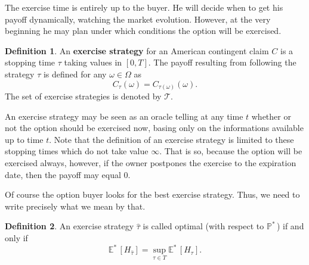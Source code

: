 \documentclass[a4paper,12pt, oneside]{book}
\theoremstyle{definition}
\newtheorem{mydef}{Definition}[chapter]
\theoremstyle{remark}
\def\Em{{\mathbb{E}^*}\,}
\def\Pm{{\mathbb{P}}^*\,}
\begin{document}
The exercise time is entirely up to the buyer. He will decide when to get his payoff dynamically, watching the market evolution. However, at the very beginning he may plan under which conditions the option will be exercised.
\begin{mydef}
 An \textbf{exercise strategy} for an American contingent claim $C$ is a stopping time $\tau$ taking values in $[0,T]$. The payoff resulting from following the strategy $\tau$ is defined for any $\omega \in \Omega$ as
 \[ C_{\tau}(\omega) = C_{\tau(\omega)}(\omega).\]
 The set of exercise strategies is denoted by $\mathcal{T}$. 
\end{mydef}
An exercise strategy may be seen as an oracle telling at any time $t$ whether or not the option should be exercised now, basing only on the informations available up to time $t$. Note that the definition of an exercise strategy is limited to these stopping times which do not take value $\infty$. That is so, because the option will be exercised always, however, if the owner postpones the exercise to the expiration date, then the payoff may equal 0.

Of course the option buyer looks for the best exercise strategy. Thus, we need to write precisely what we mean by that.
\begin{mydef}
 An exercise strategy $\hat{\tau}$ is called optimal (with respect to $\Pm$) if and only if
\begin{equation}
\label{eq:AM_optStrategy}
\Em[H_{\hat{\tau}}] = \sup\limits_{\tau \in T} \Em[H_{\tau}]. 
\end{equation}
\end{mydef}
\end{document}
